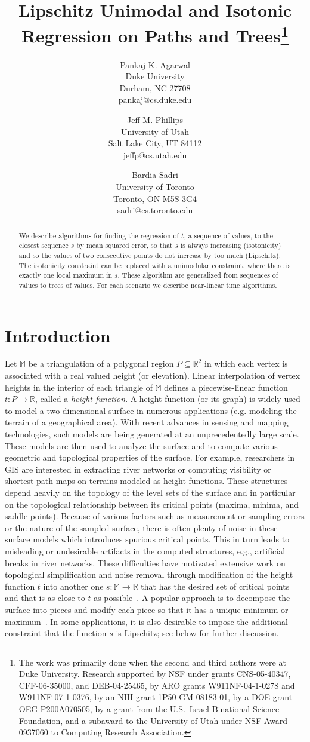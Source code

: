 \documentclass[11pt]{article}
\title{Lipschitz Unimodal and Isotonic Regression on Paths and Trees\footnote{The work was primarily done when the second and third authors were at Duke University. Research supported by NSF under grants
    CNS-05-40347, CFF-06-35000, and DEB-04-25465, by ARO grants
    W911NF-04-1-0278 and W911NF-07-1-0376, by an NIH grant
    1P50-GM-08183-01, by a DOE grant OEG-P200A070505, by a grant
    from the U.S.--Israel Binational Science Foundation, and a subaward to the University of Utah under NSF Award 0937060 to Computing Research Association.}}
\author{\begin{tabular}{c}
	Pankaj K. Agarwal\\
	\small Duke University\\
	\small Durham, NC 27708\\
	\small pankaj@cs.duke.edu
	\end{tabular}
	\and 
	\begin{tabular}{c}
	Jeff M. Phillips\\
	\small University of Utah\\
	\small Salt Lake City, UT 84112\\
	\small jeffp@cs.utah.edu
	\end{tabular}
	\and 
	\begin{tabular}{c}
	Bardia Sadri\\
	\small University of Toronto\\
	\small Toronto, ON M5S 3G4\\
	\small sadri@cs.toronto.edu
	\end{tabular}
}
\def\MM{\mathbb{M}}
\def\reals{\mathbb{R}}
\begin{document}
\begin{titlepage}
\maketitle
\thispagestyle{empty}
\begin{abstract}
We describe algorithms for finding the regression of $t$, a sequence of values, to the closest sequence $s$ by mean squared error, so that $s$ is always increasing (isotonicity) and so the values of two consecutive points do not increase by too much (Lipschitz).  The isotonicity constraint can be replaced with a unimodular constraint, where there is exactly one local maximum in $s$.  These algorithm are generalized from sequences of values to trees of values.  For each scenario we describe near-linear time algorithms.  
\end{abstract}
\end{titlepage}




\section{Introduction}\label{sec:intro}

Let $\MM$ be a triangulation of a polygonal region $P \subseteq \reals^2$ in which each vertex is 
associated with a real valued height (or elevation). Linear interpolation of vertex heights in the interior of 
each triangle of $\MM$ defines a piecewise-linear
function $t : P \rightarrow \reals$, called a \emph{height function}. 
A height function (or its graph) is widely used to model a 
two-dimensional surface in numerous applications (e.g. modeling the 
terrain of a geographical area).  With recent advances in sensing
and mapping technologies, such models are being generated
at an unprecedentedly large scale. These models are then used to 
analyze the surface and to compute various geometric and 
topological properties of the surface. For example, researchers in GIS
are interested in extracting river networks or computing visibility 
or shortest-path maps on terrains modeled as height functions. These structures depend heavily on 
the topology of the level sets of the surface and in particular on the topological relationship between its critical 
points (maxima, minima, and saddle points). 
Because of various factors such as measurement or sampling errors or the nature of the sampled surface, 
there is often plenty of noise in these surface models which introduces spurious 
critical points. This in turn leads to misleading or 
undesirable artifacts in the computed structures, e.g.,
artificial breaks in river networks. These difficulties have motivated
extensive work on topological simplification and noise removal through modification of the height function $t$ into another one 
$s: \MM \rightarrow \reals$ that has the desired set 
of critical points and that is as close to $t$ as 
possible~\cite{Bremer:03,Ni:04,Soille:04,Soille:04a,vKS09}. A popular
approach is to decompose the surface into pieces and modify each
piece so that it has a unique minimum or maximum~\cite{Soille:03a}.  In some applications, it is also desirable to impose the additional constraint that the function $s$ is Lipschitz; see below for further discussion. 
\end{document}
